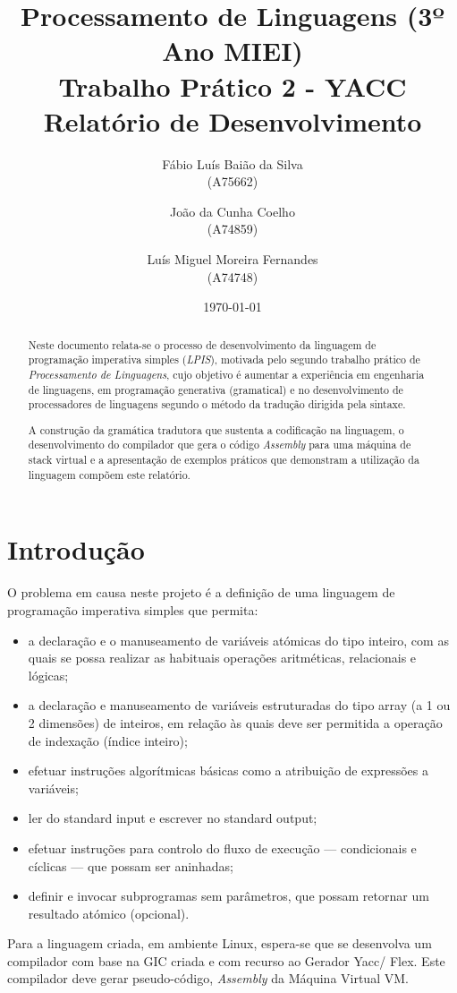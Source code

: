 \documentclass{report}
\title{Processamento de Linguagens (3º Ano MIEI)\\ \textbf{Trabalho Prático 2 - YACC}\\ Relatório de Desenvolvimento}
\author{Fábio Luís Baião da Silva\\ (A75662) \and João da Cunha Coelho\\ (A74859) \and Luís Miguel Moreira Fernandes\\ (A74748) }
\date{\today}
\begin{document}
\maketitle

\begin{abstract}
Neste documento relata-se o processo de desenvolvimento da linguagem de programação imperativa simples (\textit{LPIS}), motivada pelo segundo trabalho prático de \textit{Processamento de Linguagens}, cujo objetivo é aumentar a experiência em engenharia de linguagens, em programação generativa (gramatical) e no desenvolvimento de processadores de linguagens segundo o método da tradução dirigida pela sintaxe.\par
A construção da gramática tradutora que sustenta a codificação na linguagem, o desenvolvimento do compilador que gera o código \textit{Assembly} para uma máquina de stack virtual e a apresentação de exemplos práticos que demonstram a utilização da linguagem compõem este relatório. 
\end{abstract}

\tableofcontents

\chapter{Introdução} \label{intro}
O problema em causa neste projeto é a definição de uma linguagem de programação imperativa simples que permita:
\begin{itemize}
\item a declaração e o manuseamento de variáveis atómicas do tipo inteiro, com as quais se possa realizar as habituais operações aritméticas, relacionais e lógicas;
\item a declaração e manuseamento de variáveis estruturadas do tipo array (a 1 ou 2 dimensões) de inteiros, em relação às quais deve ser permitida a operação de indexação (índice inteiro);
\item efetuar instruções algorítmicas básicas como a atribuição de expressões a variáveis;
\item ler do standard input e escrever no standard output;
\item efetuar instruções para controlo do fluxo de execução — condicionais e cíclicas — que possam ser aninhadas;
\item definir e invocar subprogramas sem parâmetros, que possam retornar um resultado atómico (opcional).
\end{itemize}
Para a linguagem criada, em ambiente Linux, espera-se que se desenvolva um compilador com base na GIC criada e com recurso ao Gerador Yacc/
Flex. Este compilador deve gerar pseudo-código, \textit{Assembly} da Máquina Virtual VM.
\end{document}
